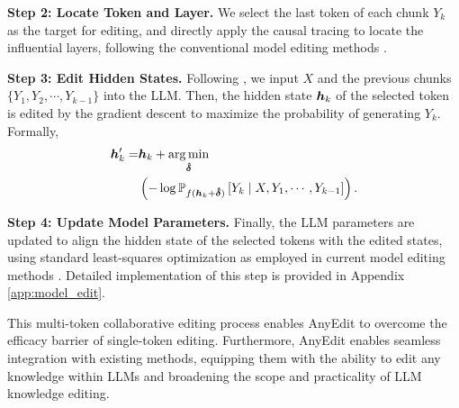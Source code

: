 \textbf{Step 2: Locate Token and Layer.}
We select the last token of each chunk $Y_k$ as the target for editing, and directly apply the causal tracing to locate the influential layers, following the conventional model editing methods \cite{ROME}.

\textbf{Step 3: Edit Hidden States.}
Following , we input $X$ and the previous chunks $\{Y_1,Y_2,\cdots,Y_{k-1}\}$ into the LLM. Then, the hidden state ${\bm{h}}_k$ of the selected token is edited by the gradient descent to maximize the probability of generating $Y_k$. Formally,
\begin{equation}
\begin{aligned}
    {\bm{h}}'_k=& {\bm{h}}_k+ \operatorname*{arg\,min}_{\bm{\hat{\delta}}} \\
    & \left( -\log \mathbb{P}_{f({\bm{h}}_k+\bm{\hat{\delta}})} \left[Y_k \mid X, Y_1, \cdots, Y_{k-1}\right] \right).
\end{aligned}
\end{equation}

\textbf{Step 4: Update Model Parameters.}
Finally, the LLM parameters are updated to align the hidden state of the selected tokens with the edited states, using standard least-squares optimization as employed in current model editing methods \cite{ROME}. Detailed implementation of this step is provided in Appendix \ref{app:model_edit}.

This multi-token collaborative editing process enables AnyEdit to overcome the efficacy barrier of single-token editing. Furthermore, AnyEdit enables seamless integration with existing methods, equipping them with the ability to edit any knowledge within LLMs and broadening the scope and practicality of LLM knowledge editing.